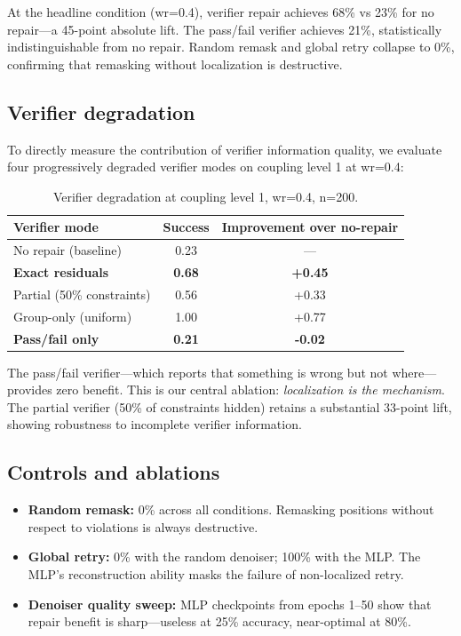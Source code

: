 \documentclass[11pt,a4paper,twoside]{article}
\theoremstyle{definition}
\begin{document}
At the headline condition (wr=0.4), verifier repair achieves 68\% vs 23\% for no repair---a 45-point absolute lift. The pass/fail verifier achieves 21\%, statistically indistinguishable from no repair. Random remask and global retry collapse to 0\%, confirming that remasking without localization is destructive.

\subsection{Verifier degradation}
\label{sec:degradation}

To directly measure the contribution of verifier information quality, we evaluate four progressively degraded verifier modes on coupling level 1 at wr=0.4:

\begin{table}[ht]
\centering
\caption{Verifier degradation at coupling level 1, wr=0.4, n=200.}
\label{tab:degrade}
\begin{tabular}{lcc}
\toprule
Verifier mode & Success & Improvement over no-repair \\
\midrule
No repair (baseline) & 0.23 & --- \\
\textbf{Exact residuals} & \textbf{0.68} & \textbf{+0.45} \\
Partial (50\% constraints) & 0.56 & +0.33 \\
Group-only (uniform) & 1.00 & +0.77 \\
\textbf{Pass/fail only} & \textbf{0.21} & \textbf{-0.02} \\
\bottomrule
\end{tabular}
\end{table}

The pass/fail verifier---which reports that something is wrong but not where---provides zero benefit. This is our central ablation: \emph{localization is the mechanism}. The partial verifier (50\% of constraints hidden) retains a substantial 33-point lift, showing robustness to incomplete verifier information.

\subsection{Controls and ablations}
\label{sec:controls}

\begin{itemize}[leftmargin=2em]
    \item \textbf{Random remask:} 0\% across all conditions. Remasking positions without respect to violations is always destructive.
    \item \textbf{Global retry:} 0\% with the random denoiser; 100\% with the MLP. The MLP's reconstruction ability masks the failure of non-localized retry.
    \item \textbf{Denoiser quality sweep:} MLP checkpoints from epochs 1--50 show that repair benefit is sharp---useless at 25\% accuracy, near-optimal at 80\%.
\end{itemize}
\end{document}
